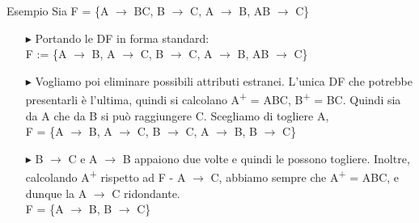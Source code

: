 \documentclass{beamer}
\begin{document}
\begin{frame}{Esempio}
Sia F = \{A $\rightarrow$ BC, B $\rightarrow$ C, A $\rightarrow$ B, AB $\rightarrow$ C\}
\begin{itemize}
    \item[$\blacktriangleright$] Portando le DF in forma standard:\\
    F := \{A $\rightarrow$ B, A $\rightarrow$ C, B $\rightarrow$ C, A $\rightarrow$ B, AB $\rightarrow$ C\}
    \item[$\blacktriangleright$] Vogliamo poi eliminare possibili attributi estranei. L'unica DF che potrebbe presentarli è l'ultima, quindi si calcolano A\textsuperscript{+} = ABC, B\textsuperscript{+} = BC. Quindi sia da A che da B si può raggiungere C. Scegliamo  di togliere A, \\
    F = \{A $\rightarrow$ B, A $\rightarrow$ C, B $\rightarrow$ C, A $\rightarrow$ B, B $\rightarrow$ C\}
    \item[$\blacktriangleright$] B $\rightarrow$ C e A $\rightarrow$ B appaiono due volte e quindi le possono togliere. Inoltre, calcolando A\textsuperscript{+} rispetto ad F - A $\rightarrow$ C, abbiamo sempre che A\textsuperscript{+} = ABC, e dunque la A $\rightarrow$ C ridondante.\\
    
    F = \{A $\rightarrow$ B, B $\rightarrow$ C\}
\end{itemize}
\end{frame}
\end{document}
